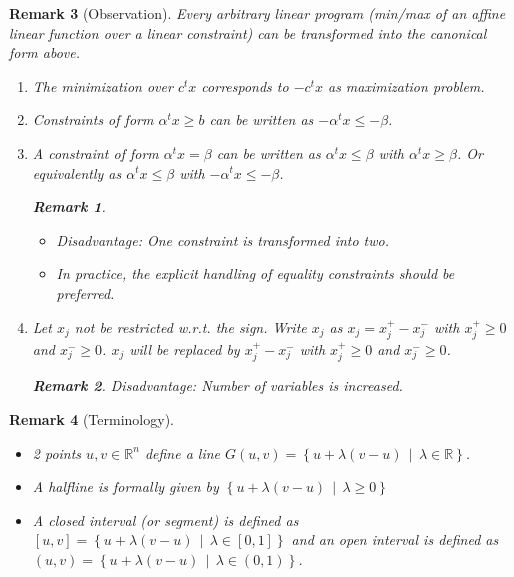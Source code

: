 \documentclass[a4paper]{article}
\numberwithin{lecref}{subsection}
\newtheorem*{Remark}{Remark}
\newcommand{\SetDef}[2]{\left\{#1\,\mid\,#2\right\}}
\begin{document}
\begin{Remark}[Observation]
  Every arbitrary linear program (min/max of an affine linear function over a linear constraint) can be transformed into the canonical form above.
  \begin{enumerate}
  	\item The minimization over $c^t x$ corresponds to $-c^t x$ as maximization problem.
  	\item Constraints of form $\alpha^t x \geq b$ can be written as $-\alpha^t x \leq -\beta$.
  	\item A constraint of form $\alpha^t x = \beta$ can be written as $\alpha^t x \leq \beta$ with $\alpha^t x \geq \beta$. Or equivalently as $\alpha^t x \leq \beta$ with $-\alpha^t x \leq -\beta$.
  		\begin{Remark} \hfill
	  		\begin{itemize}
	  			\item Disadvantage: One constraint is transformed into two.
	  			\item In practice, the explicit handling of equality constraints should be preferred.
	  		\end{itemize}
  		\end{Remark}
  	\item Let $x_j$ not be restricted w.r.t. the sign. Write $x_j$ as $x_j = x_j^+ - x_j^-$ with $x_j^+ \geq 0$ and $x_j^- \geq 0$.
  		$x_j$ will be replaced by $x_j^+ - x_j^-$ with $x_j^+ \geq 0$ and $x_j^- \geq 0$.
  		\begin{Remark}
  			Disadvantage: Number of variables is increased.
  		\end{Remark}
  \end{enumerate}
\end{Remark}

\begin{Remark}[Terminology] \hfill{}
  \begin{itemize}
  	\item 2 points $u, v \in \mathbb R^n$ define a \emph{line} $G(u, v) = \SetDef{u + \lambda (v - u)}{\lambda \in \mathbb R}$. 
  	\item A \emph{halfline} is formally given by $\SetDef{u + \lambda (v - u)}{\lambda \geq 0}$ 
  	\item A \emph{closed interval} (or \emph{segment}) is defined as $[u, v] = \SetDef{u + \lambda (v - u)}{\lambda \in [0, 1]}$ and
  		an \emph{open interval} is defined as $(u, v) = \SetDef{u + \lambda (v - u)}{\lambda \in (0, 1)}$. 
  \end{itemize}
\end{Remark}
\end{document}
